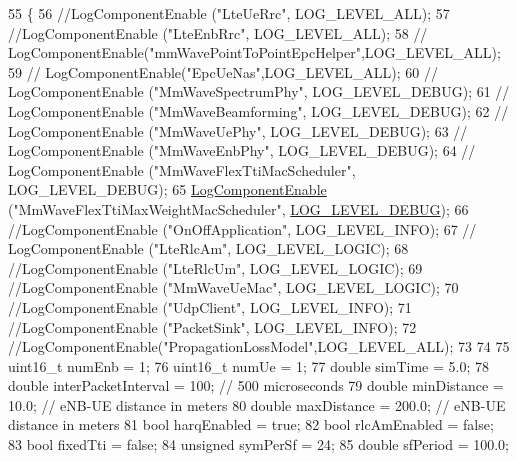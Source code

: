 \begin{DoxyCode}
55 \{
56         \textcolor{comment}{//LogComponentEnable ("LteUeRrc", LOG\_LEVEL\_ALL);}
57         \textcolor{comment}{//LogComponentEnable ("LteEnbRrc", LOG\_LEVEL\_ALL);}
58         \textcolor{comment}{//      LogComponentEnable("mmWavePointToPointEpcHelper",LOG\_LEVEL\_ALL);}
59         \textcolor{comment}{//      LogComponentEnable("EpcUeNas",LOG\_LEVEL\_ALL);}
60 \textcolor{comment}{//              LogComponentEnable ("MmWaveSpectrumPhy", LOG\_LEVEL\_DEBUG);}
61 \textcolor{comment}{//      LogComponentEnable ("MmWaveBeamforming", LOG\_LEVEL\_DEBUG);}
62 \textcolor{comment}{//      LogComponentEnable ("MmWaveUePhy", LOG\_LEVEL\_DEBUG);}
63 \textcolor{comment}{//      LogComponentEnable ("MmWaveEnbPhy", LOG\_LEVEL\_DEBUG);}
64 \textcolor{comment}{//      LogComponentEnable ("MmWaveFlexTtiMacScheduler", LOG\_LEVEL\_DEBUG);}
65         \hyperlink{namespacens3_adc4ef4f00bb2f5f4edae67fc3bc27f20}{LogComponentEnable} (\textcolor{stringliteral}{"MmWaveFlexTtiMaxWeightMacScheduler"}, 
      \hyperlink{namespacens3_aa6464a4d69551a9cc968e17a65f39bdbabc85ae851e992c4d8577705c712061ef}{LOG\_LEVEL\_DEBUG});
66         \textcolor{comment}{//LogComponentEnable ("OnOffApplication", LOG\_LEVEL\_INFO);}
67 \textcolor{comment}{//      LogComponentEnable ("LteRlcAm", LOG\_LEVEL\_LOGIC);}
68         \textcolor{comment}{//LogComponentEnable ("LteRlcUm", LOG\_LEVEL\_LOGIC);}
69         \textcolor{comment}{//LogComponentEnable ("MmWaveUeMac", LOG\_LEVEL\_LOGIC);}
70         \textcolor{comment}{//LogComponentEnable ("UdpClient", LOG\_LEVEL\_INFO);}
71         \textcolor{comment}{//LogComponentEnable ("PacketSink", LOG\_LEVEL\_INFO);}
72         \textcolor{comment}{//LogComponentEnable("PropagationLossModel",LOG\_LEVEL\_ALL);}
73 
74 
75         uint16\_t numEnb = 1;
76         uint16\_t numUe = 1;
77         \textcolor{keywordtype}{double} simTime = 5.0;
78         \textcolor{keywordtype}{double} interPacketInterval = 100;  \textcolor{comment}{// 500 microseconds}
79         \textcolor{keywordtype}{double} minDistance = 10.0;  \textcolor{comment}{// eNB-UE distance in meters}
80         \textcolor{keywordtype}{double} maxDistance = 200.0;  \textcolor{comment}{// eNB-UE distance in meters}
81         \textcolor{keywordtype}{bool} harqEnabled = \textcolor{keyword}{true};
82         \textcolor{keywordtype}{bool} rlcAmEnabled = \textcolor{keyword}{false};
83         \textcolor{keywordtype}{bool} fixedTti = \textcolor{keyword}{false};
84         \textcolor{keywordtype}{unsigned} symPerSf = 24;
85         \textcolor{keywordtype}{double} sfPeriod = 100.0;

\end{DoxyCode}
